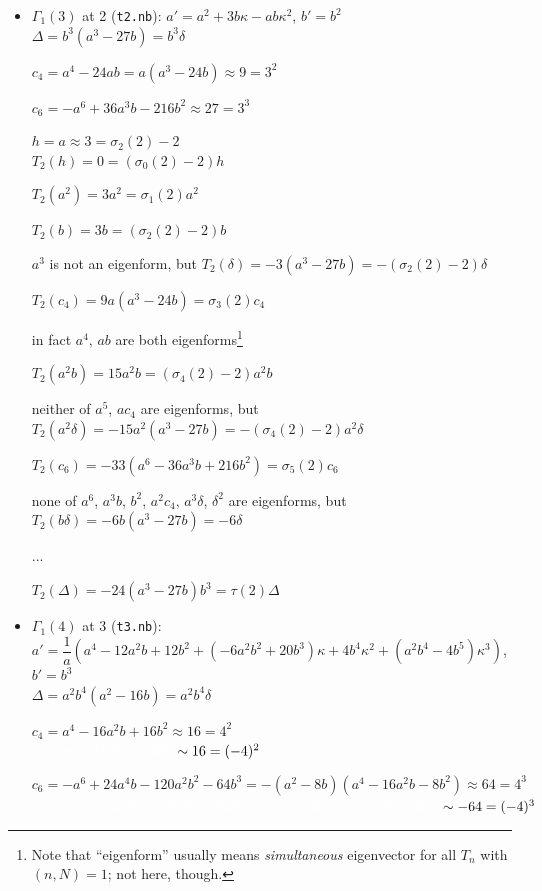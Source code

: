 \documentclass{rs}
\theoremstyle{definition}
\theoremstyle{remark}
\renewcommand{\d}{\delta}
\newcommand{\G}{\Gamma}
\newcommand{\K}{\kappa}
\newcommand{\si}{\sigma}
\newcommand{\T}{\tau}
\renewcommand{\=}{\approx}
\renewcommand{\-}{\sim}
\newcommand{\wt}[1]{\textcolor{white}{#1} \!~}
\numberwithin{equation}{section}
\numberwithin{thm}{section}
\begin{document}
\begin{itemize}
 \item $\G_1(3)$ at 2 (\texttt{t2.nb}): $a' = a^2 + 3 b \K - a b \K^2$, $b' = b^2$ \\

 $\Delta = b^3 (a^3 - 27 b) = b^3 \d$ 

 $c_4 = a^4 - 24 a b = a (a^3 - 24 b) \= 9 = 3^2$ 

 $c_6 = -a^6 + 36 a^3 b - 216 b^2 \= 27 = 3^3$ 

 $h = a \= 3 = \si_2(2) - 2$ \\

 $T_2(h) = 0 = (\si_0(2) - 2) h$ 

 $T_2(a^2) = 3 a^2 = \si_1(2) a^2$ 

 $T_2(b) = 3 b = (\si_2(2) - 2) b$ 

 \hfill $a^3$ is not an eigenform, but $T_2(\d) = -3 (a^3 - 27 b) = -(\si_2(2) - 2) \d$ 

 $T_2(c_4) = 9 a (a^3 - 24 b) = \si_3(2) c_4$ 

 \hfill in fact $a^4$, $a b$ are both eigenforms\footnote{Note that ``eigenform'' usually means {\em simultaneous} eigenvector for all $T_n$ with $(n,N) = 1$; 
 not here, though.  } 

 $T_2(a^2 b) = 15 a^2 b = (\si_4(2) - 2) a^2 b$ 

 \hfill neither of $a^5$, $a c_4$ are eigenforms, but $T_2(a^2 \d) = -15 a^2 (a^3 - 27 b) = -(\si_4(2) - 2) a^2 \d$ 

 $T_2(c_6) = -33 (a^6 - 36 a^3 b + 216 b^2) = \si_5(2) c_6$ 

 \hfill none of $a^6$, $a^3 b$, $b^2$, $a^2 c_4$, $a^3 \d$, $\d^2$ are eigenforms, but $T_2(b \d) = -6 b (a^3 - 27 b) = -6 \d$ 

 ... 

 $T_2(\Delta) = -24 (a^3 - 27 b) b^3 = \T(2) \Delta$ \\

 \item $\G_1(4)$ at 3 (\texttt{t3.nb}): $a' = \dfrac{1}{a} (a^4 - 12 a^2 b + 12 b^2 + (-6 a^2 b^2 + 20 b^3) \K + 4 b^4 \K^2 + (a^2 b^4 - 4 b^5) \K^3)$, $b' = b^3$ \\

 $\Delta = a^2 b^4 (a^2 - 16 b) = a^2 b^4 \d$ 

 $c_4 = a^4 - 16 a^2 b + 16 b^2 \= 16 = 4^2$ \\
 $\wt{c_4 = a^4 - 16 a^2 b + 16 b^2} \- 16 = (-4)^2$ 

 $c_6 = -a^6 + 24 a^4 b - 120 a^2 b^2 - 64 b^3 = -(a^2 - 8 b) (a^4 - 16 a^2 b - 8 b^2) \= 64 = 4^3$ \\
 $\wt{c_6 = -a^6 + 24 a^4 b - 120 a^2 b^2 - 64 b^3 = -(a^2 - 8 b) (a^4 - 16 a^2 b - 8 b^2)} \- -64 = (-4)^3$ 


\end{itemize}
\end{document}
